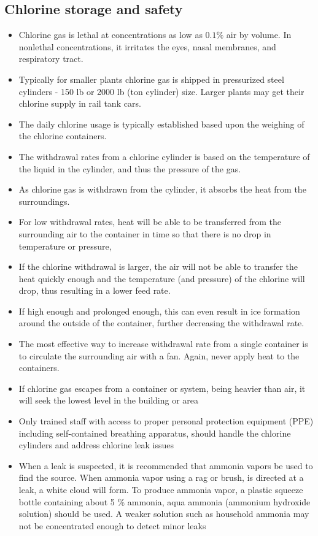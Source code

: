 \subsection{Chlorine storage and safety}
\begin{itemize}
	\item Chlorine gas is lethal at concentrations as low as $0.1 \%$ air by volume. In nonlethal concentrations, it irritates the eyes, nasal membranes, and respiratory tract.
	\item Typically for smaller plants chlorine gas is shipped in  pressurized steel cylinders - 150 lb or 2000 lb (ton cylinder) size.  Larger plants may get their chlorine supply in rail tank cars.  
	\item The daily chlorine usage is typically established based upon the weighing of the chlorine containers.
	\item The withdrawal rates from a chlorine cylinder is based on the temperature of the liquid in the cylinder, and thus the pressure of the gas. 
	\item As chlorine gas is withdrawn from the cylinder, it absorbs the heat from the surroundings.
	\item For low withdrawal rates, heat will be able to be transferred from the surrounding air to the container in time so that there is no drop in temperature or pressure, 
	\item If the chlorine withdrawal is larger, the air will not be able to transfer the heat quickly enough and the temperature (and pressure) of the chlorine will drop, thus resulting in a lower feed rate. 
	\item If high enough and prolonged enough, this can even result in ice formation around the outside of the container, further decreasing the withdrawal rate. 
	\item The most effective way to increase withdrawal rate from a single container is to circulate the surrounding air with a fan. Again, never apply heat to the containers.
	\item If chlorine gas escapes from a container or system, being heavier than air, it will seek the lowest level in the building or area
	\item Only trained staff with access to proper personal protection equipment (PPE) including self-contained breathing apparatus, should handle the chlorine cylinders and address chlorine leak issues 
	\item When a leak is suspected, it is recommended that ammonia vapors be used to find the source. When ammonia vapor using a rag or brush, is directed at a leak, a white cloud will form. To produce ammonia vapor, a plastic squeeze bottle containing about 5 \% ammonia, aqua ammonia (ammonium hydroxide solution) should be used. A weaker solution such as household ammonia may not be concentrated enough to detect minor leaks

\end{itemize}

